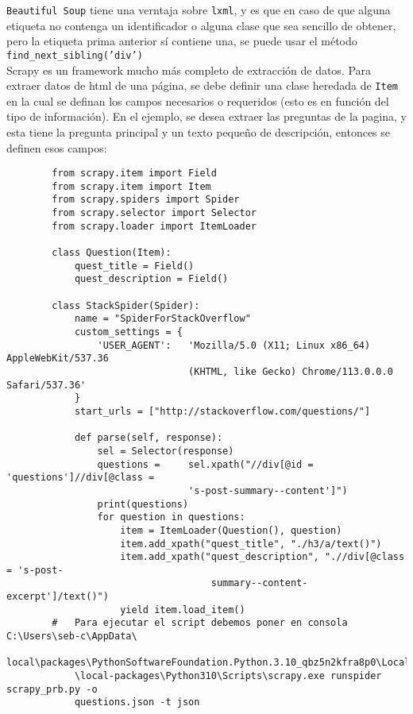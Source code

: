     \texttt{Beautiful Soup} tiene una verntaja sobre \texttt{lxml}, y es que en caso de que alguna etiqueta no contenga un identificador o alguna clase que sea sencillo de obtener, pero la etiqueta prima anterior sí contiene una, se puede usar el método \texttt{find\_next\_sibling('div')} \\

    Scrapy es un framework mucho más completo de extracción de datos. Para extraer datos de html de una página, se debe definir una clase heredada de \texttt{Item} en la cual se definan los campos necesarios o requeridos (esto es en función del tipo de información). En el ejemplo, se desea extraer las preguntas de la pagina, y esta tiene la pregunta principal y un texto pequeño de descripción, entonces se definen esos campos:

    \begin{verbatim}
        from scrapy.item import Field
        from scrapy.item import Item
        from scrapy.spiders import Spider
        from scrapy.selector import Selector
        from scrapy.loader import ItemLoader
            
        class Question(Item):
            quest_title = Field()
            quest_description = Field()
            
        class StackSpider(Spider):
            name = "SpiderForStackOverflow"
            custom_settings = {
                'USER_AGENT':   'Mozilla/5.0 (X11; Linux x86_64) AppleWebKit/537.36 
                                (KHTML, like Gecko) Chrome/113.0.0.0 Safari/537.36'
            }
            start_urls = ["http://stackoverflow.com/questions/"]
            
            def parse(self, response):
                sel = Selector(response)
                questions =     sel.xpath("//div[@id = 'questions']//div[@class = 
                                's-post-summary--content']")
                print(questions)
                for question in questions:
                    item = ItemLoader(Question(), question)
                    item.add_xpath("quest_title", "./h3/a/text()")
                    item.add_xpath("quest_description", ".//div[@class = 's-post-
                                    summary--content-excerpt']/text()")
                    yield item.load_item()
        #   Para ejecutar el script debemos poner en consola C:\Users\seb-c\AppData\
            local\packages\PythonSoftwareFoundation.Python.3.10_qbz5n2kfra8p0\LocalCache
            \local-packages\Python310\Scripts\scrapy.exe runspider scrapy_prb.py -o 
            questions.json -t json
    \end{verbatim}

